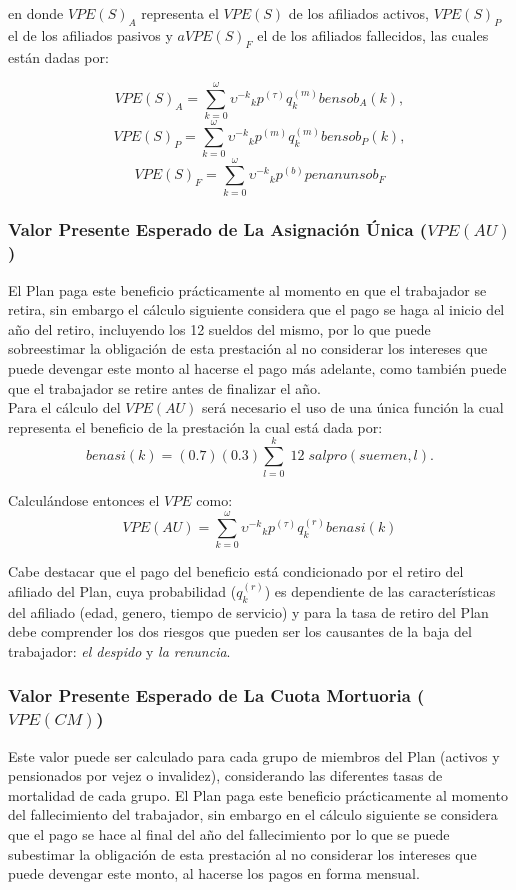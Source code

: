 \documentclass[12pt,letterpaper,titlepage]{article}
\begin{document}
{en donde $V\!PE(S)_{A}$ representa el $V\!PE(S)$ de los afiliados activos, $V\!PE(S)_{P}$ el de los afiliados pasivos y $aV\!PE(S)_{F}$ el de los afiliados fallecidos, las cuales están dadas por:

\[V\!PE(S)_{A}=\sum\limits_{k=0}^\omega\!\upsilon^{-k}\!_{k}p^{(\tau)}\!q_{k}^{(m)}\!bensob_{A}(k),\]
\[V\!PE(S)_{P}=\sum\limits_{k=0}^\omega\!\upsilon^{-k}\!_{k}p^{(m)}\!q_{k}^{(m)}\!bensob_{P}(k),\]
\[V\!PE(S)_{F}=\sum\limits_{k=0}^\omega\!\upsilon^{-k}\!_{k}p^{(b)}penanunsob_{F}\]


\subsubsection{Valor Presente Esperado de La Asignación Única ($V\!PE(AU)$)}

El Plan paga este beneficio prácticamente al momento en que el trabajador se retira, sin embargo el cálculo siguiente considera que el pago se haga al inicio del año del retiro, incluyendo los 12 sueldos del mismo, por lo que puede sobreestimar la obligación de esta prestación al no considerar los intereses que puede devengar este monto al hacerse el pago más adelante, como también puede que el trabajador se retire antes de finalizar el año. \\

Para el cálculo del  $V\!PE(AU)$ será necesario el uso de una única función la cual representa el beneficio de la prestación la cual está dada por:
\[benasi(k)=(0.7)(0.3)\sum\limits_{l=0}^{k}\;12\;sal\!pro(suemen,l).\]
 
Calculándose entonces el $VPE$ como:
\[ V\!PE(AU)=\sum\limits_{k=0}^{\omega}\!\upsilon^{-k}\!_{k}p^{(\tau)}\!q_{k}^{(r)}\!benasi(k)\]

Cabe destacar que el pago del beneficio está condicionado por el retiro del afiliado del Plan, cuya probabilidad ($q_{k}^{(r)}$) es dependiente de las características del afiliado (edad, genero, tiempo de servicio) y para la tasa de retiro del Plan debe comprender los dos riesgos que pueden ser los causantes de la baja del trabajador: \textit{el despido} y \textit{la renuncia}.

\subsubsection{Valor Presente Esperado de La Cuota Mortuoria ($V\!PE(CM)$)}

Este valor puede ser calculado para cada grupo de miembros del Plan (activos y pensionados por vejez o invalidez), considerando las diferentes tasas de mortalidad de cada grupo. El Plan paga este beneficio prácticamente al momento del fallecimiento del trabajador, sin embargo en el cálculo siguiente se considera que el pago se hace al final del año del fallecimiento por lo que se puede subestimar la obligación de esta prestación al no considerar los intereses que puede devengar este monto, al hacerse los pagos en forma mensual.\\

}
\end{document}
